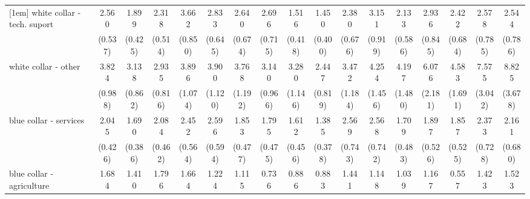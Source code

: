 {\begin{tabular}{l*{16}{c}}
[1em]
white collar - tech. suport&       2.560\sym{***}&       1.899\sym{**} &       2.318\sym{***}&       3.662\sym{***}&       2.833\sym{***}&       2.640\sym{***}&       2.696\sym{***}&       1.516         &       1.450         &       2.380\sym{**} &       3.151\sym{***}&       2.133\sym{**} &       2.936\sym{***}&       2.422\sym{**} &       2.578\sym{**} &       2.544\sym{**} \\
                    &     (0.537)         &     (0.425)         &     (0.514)         &     (0.850)         &     (0.645)         &     (0.674)         &     (0.715)         &     (0.418)         &     (0.400)         &     (0.676)         &     (0.919)         &     (0.586)         &     (0.845)         &     (0.684)         &     (0.785)         &     (0.786)         \\
[1em]
white collar - other&       3.824\sym{***}&       3.138\sym{***}&       2.935\sym{***}&       3.896\sym{***}&       3.900\sym{***}&       3.768\sym{***}&       3.140\sym{***}&       3.280\sym{***}&       2.447\sym{**} &       3.472\sym{***}&       4.254\sym{***}&       4.197\sym{***}&       6.076\sym{***}&       4.583\sym{***}&       7.575\sym{***}&       8.825\sym{***}\\
                    &     (0.988)         &     (0.862)         &     (0.816)         &     (1.074)         &     (1.120)         &     (1.192)         &     (0.966)         &     (1.146)         &     (0.819)         &     (1.184)         &     (1.456)         &     (1.480)         &     (2.181)         &     (1.691)         &     (3.042)         &     (3.678)         \\
[1em]
blue collar - services&       2.045\sym{***}&       1.690\sym{*}  &       2.084\sym{***}&       2.452\sym{***}&       2.596\sym{***}&       1.853\sym{*}  &       1.795\sym{*}  &       1.612         &       1.385         &       2.569\sym{**} &       2.568\sym{**} &       1.709         &       1.897\sym{*}  &       1.857\sym{*}  &       2.373\sym{**} &       2.161\sym{*}  \\
                    &     (0.426)         &     (0.386)         &     (0.462)         &     (0.564)         &     (0.594)         &     (0.477)         &     (0.475)         &     (0.456)         &     (0.378)         &     (0.743)         &     (0.742)         &     (0.483)         &     (0.526)         &     (0.525)         &     (0.728)         &     (0.680)         \\
[1em]
blue collar - agriculture&       1.684         &       1.410         &       1.796         &       1.664         &       1.224         &       1.115         &       0.736         &       0.886         &       0.883         &       1.441         &       1.148         &       1.039         &       1.167         &       0.557         &       1.423         &       1.523         \\

\end{tabular}}
